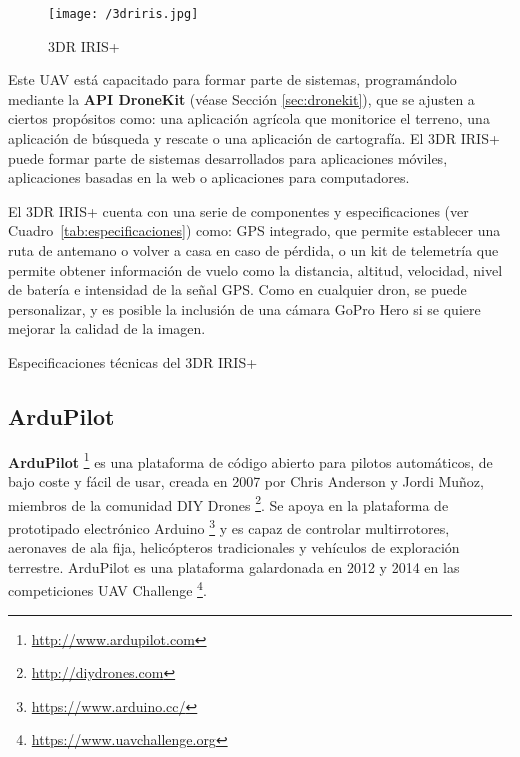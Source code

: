 \begin{figure}[!h]
\begin{center}
\texttt{[image: /3driris.jpg]}
\caption[3DR IRIS+]{3DR IRIS+}
\label{fig:3dririsplus}
\end{center}
\end{figure}

Este \acs{UAV} está capacitado para formar parte de sistemas, programándolo mediante la \textbf{\acs{API} DroneKit} (véase Sección \ref{sec:dronekit}), que se ajusten a ciertos propósitos como: una aplicación agrícola que monitorice el terreno, una aplicación de búsqueda y rescate o una aplicación de cartografía. El 3DR IRIS+ puede formar parte de sistemas desarrollados para aplicaciones móviles, aplicaciones basadas en la web o aplicaciones para computadores.

El 3DR IRIS+ cuenta con una serie de componentes y especificaciones (ver Cuadro~\ref{tab:especificaciones}) como: GPS integrado, que permite establecer una ruta de antemano o volver a casa en caso de pérdida, o un kit de telemetría que permite obtener información de vuelo como la distancia, altitud, velocidad, nivel de batería e intensidad de la señal \acs{GPS}. Como en cualquier dron, se puede personalizar, y es posible la inclusión de una cámara GoPro Hero si se quiere mejorar la calidad de la imagen.

\begin{table}[!h]
 \centering
 {\small
 
 }
 \caption[Especificaciones técnicas del 3DR IRIS+]
 {Especificaciones técnicas del 3DR IRIS+ \cite{especifaciones3dr}}
 \label{tab:especificaciones}
\end{table}

\subsection{ArduPilot}
\label{sec:ardupilot}

\textbf{ArduPilot} \footnote{\url{http://www.ardupilot.com}} es una plataforma de código abierto para pilotos automáticos, de bajo coste y fácil de usar, creada en 2007 por Chris Anderson y Jordi Muñoz, miembros de la comunidad DIY Drones \footnote{\url{http://diydrones.com}}. Se apoya en la plataforma de prototipado electrónico Arduino \footnote{\url{https://www.arduino.cc/}} y es capaz de controlar multirrotores, aeronaves de ala fija, helicópteros tradicionales y vehículos de exploración terrestre. ArduPilot es una plataforma galardonada en 2012 y 2014 en las competiciones UAV Challenge \footnote{\url{https://www.uavchallenge.org}}.

